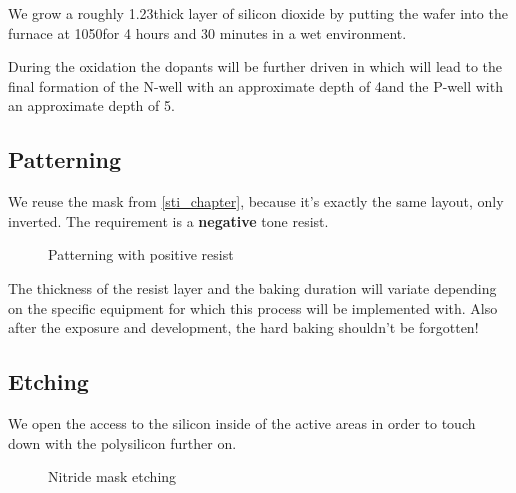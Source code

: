 We grow a roughly 1.23\um thick layer of silicon dioxide by putting the wafer into the furnace at 1050\degreesC for 4 hours and 30 minutes in a wet environment.

During the oxidation the dopants will be further driven in which will lead to the final formation of the N-well with an approximate depth of 4\um and the P-well with an approximate depth of 5\um.

\subsection{Patterning}

We reuse the mask from \autoref{sti_chapter}, because it's exactly the same layout, only inverted.
The requirement is a \textbf{negative} tone resist.

\begin{figure}[H]
	\centering
	\begin{tikzpicture}[node distance = 3cm, auto, thick,scale=\CrossSectionOnly, every node/.style={transform shape}]
		
	\end{tikzpicture}
	\begin{tikzpicture}[node distance = 3cm, auto, thick,scale=\CrossSectionOnly, every node/.style={transform shape}]
		
	\end{tikzpicture}
	\caption{Patterning with positive resist}
\end{figure}

The thickness of the resist layer and the baking duration will variate depending on the specific equipment for which this process will be implemented with.
Also after the exposure and development, the hard baking shouldn't be forgotten!

\newpage

\subsection{Etching}\label{fox_etch}

We open the access to the silicon inside of the active areas in order to touch down with the polysilicon further on.

\begin{figure}[H]
	\centering
	\begin{tikzpicture}[node distance = 3cm, auto, thick,scale=\CrossSectionOnly, every node/.style={transform shape}]
		
	\end{tikzpicture}
	\drawStepArrow{}
	\begin{tikzpicture}[node distance = 3cm, auto, thick,scale=\CrossSectionOnly, every node/.style={transform shape}]
		
	\end{tikzpicture}
	\caption{Nitride mask etching}
\end{figure}

